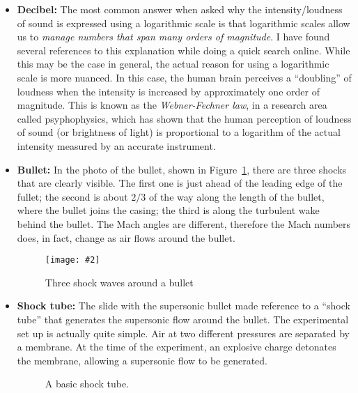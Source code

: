 \documentclass{../../oss-handout}
\newcommand{\pic}[2]{\texttt{[image: \#2]}}
\begin{document}
\begin{itemize}[leftmargin=10pt]
\item\textbf{Decibel:} The most common answer when asked why the
  intensity/loudness of sound is expressed using a logarithmic scale is that
  logarithmic scales allow us to \emph{manage numbers that span many orders of
  magnitude}. I have found several references to this explanation while doing
  a quick search online. While this may be the case in general, the actual
  reason for using a logarithmic scale is more nuanced. In this case, the human
  brain perceives a ``doubling'' of loudness when the intensity is increased by
  approximately one order of magnitude. This is known as the
  \emph{Webner-Fechner law}, in a research area called psyphophysics, which has
  shown that the human perception of loudness of sound (or brightness of light)
  is proportional to a logarithm of the actual intensity measured by an
  accurate instrument.

\item\textbf{Bullet:} In the photo of the bullet, shown in Figure~\ref{bullet},
  there are three shocks that are clearly visible. The first one is just ahead
  of the leading edge of the fullet; the second is about $2/3$ of the way along
  the length of the bullet, where the bullet joins  the casing; the third is
  along the turbulent wake behind the bullet. The Mach angles are different,
  therefore the Mach numbers does, in fact, change as air flows around the
  bullet.
  \begin{figure}[ht]
    \centering
    \pic{.4}{../images/bullet2}
    \caption{Three shock waves around a bullet}
    \label{bullet}
  \end{figure}
  
\item\textbf{Shock tube:} The slide with the supersonic bullet made reference
  to a ``shock tube'' that generates the supersonic flow around the bullet. The
  experimental set up is actually quite simple. Air at two different pressures
  are separated by a membrane. At the time of the experiment, an explosive
  charge detonates the membrane, allowing a supersonic flow to be generated.
  \begin{figure}[ht]
    \centering
    \caption{A basic shock tube.}
  \end{figure}
  

\end{itemize}
\end{document}
